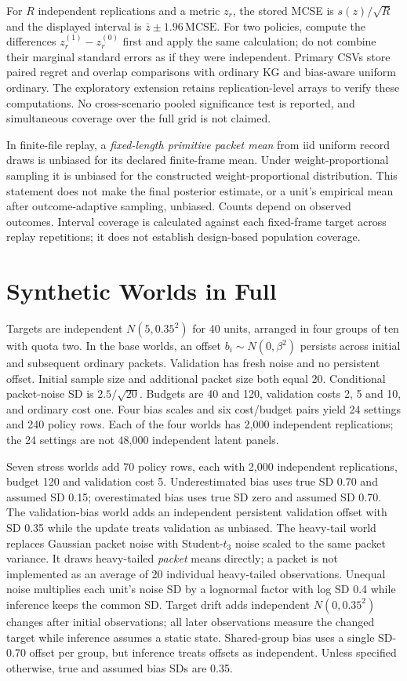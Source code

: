 For $R$ independent replications and a metric $z_r$, the stored MCSE is $s(z)/\sqrt R$ and the displayed interval is $\bar z\pm1.96\,\mathrm{MCSE}$. For two policies, compute the differences $z_r^{(1)}-z_r^{(0)}$ first and apply the same calculation; do not combine their marginal standard errors as if they were independent. Primary CSVs store paired regret and overlap comparisons with ordinary KG and bias-aware uniform ordinary. The exploratory extension retains replication-level arrays to verify these computations. No cross-scenario pooled significance test is reported, and simultaneous coverage over the full grid is not claimed.

In finite-file replay, a \emph{fixed-length primitive packet mean} from iid uniform record draws is unbiased for its declared finite-frame mean. Under weight-proportional sampling it is unbiased for the constructed weight-proportional distribution. This statement does not make the final posterior estimate, or a unit's empirical mean after outcome-adaptive sampling, unbiased. Counts depend on observed outcomes. Interval coverage is calculated against each fixed-frame target across replay repetitions; it does not establish design-based population coverage.

\section{Synthetic Worlds in Full}
Targets are independent $N(5,0.35^2)$ for 40 units, arranged in four groups of ten with quota two. In the base worlds, an offset $b_i\sim N(0,\beta^2)$ persists across initial and subsequent ordinary packets. Validation has fresh noise and no persistent offset. Initial sample size and additional packet size both equal 20. Conditional packet-noise SD is $2.5/\sqrt{20}$. Budgets are 40 and 120, validation costs 2, 5 and 10, and ordinary cost one. Four bias scales and six cost/budget pairs yield 24 settings and 240 policy rows. Each of the four worlds has 2,000 independent replications; the 24 settings are not 48,000 independent latent panels.

Seven stress worlds add 70 policy rows, each with 2,000 independent replications, budget 120 and validation cost 5. Underestimated bias uses true SD 0.70 and assumed SD 0.15; overestimated bias uses true SD zero and assumed SD 0.70. The validation-bias world adds an independent persistent validation offset with SD 0.35 while the update treats validation as unbiased. The heavy-tail world replaces Gaussian packet noise with Student-$t_3$ noise scaled to the same packet variance. It draws heavy-tailed \emph{packet} means directly; a packet is not implemented as an average of 20 individual heavy-tailed observations. Unequal noise multiplies each unit's noise SD by a lognormal factor with log SD 0.4 while inference keeps the common SD. Target drift adds independent $N(0,0.35^2)$ changes after initial observations; all later observations measure the changed target while inference assumes a static state. Shared-group bias uses a single SD-0.70 offset per group, but inference treats offsets as independent. Unless specified otherwise, true and assumed bias SDs are 0.35.

